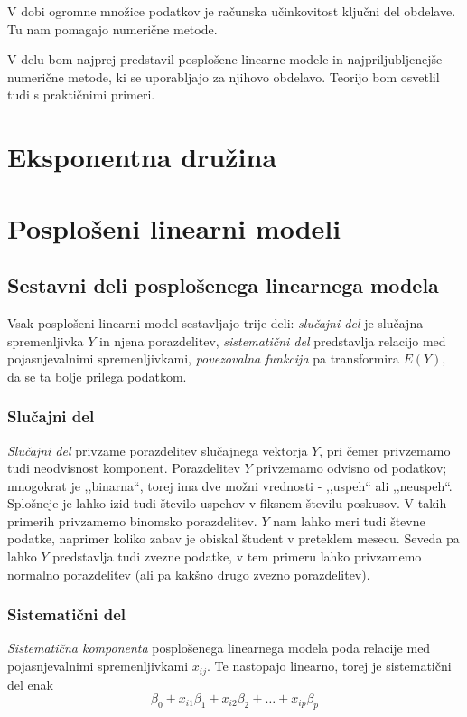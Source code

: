 \documentclass[12pt,a4paper]{amsart}
\theoremstyle{definition} %
\theoremstyle{plain} %
\begin{document}
V dobi ogromne množice podatkov je računska učinkovitost ključni del obdelave. Tu nam pomagajo numerične metode.

V delu bom najprej predstavil posplošene linearne modele in najpriljubljenejše numerične metode, ki se uporabljajo za njihovo obdelavo. 
Teorijo bom osvetlil tudi s praktičnimi primeri.

\section{Eksponentna družina} %

\section{Posplošeni linearni modeli}

\subsection{Sestavni deli posplošenega linearnega modela}
Vsak posplošeni linearni model sestavljajo trije deli: \textit{slučajni del} je slučajna spremenljivka $Y$ in njena porazdelitev, 
\textit{sistematični del} predstavlja relacijo med pojasnjevalnimi spremenljivkami, \textit{povezovalna funkcija} pa transformira $E(Y)$, da se ta
bolje prilega podatkom.

\subsubsection{Slučajni del}
\textit{Slučajni del} privzame porazdelitev slučajnega vektorja $Y$, pri čemer privzemamo tudi neodvisnost komponent. Porazdelitev $Y$
privzemamo odvisno od podatkov; mnogokrat je ,,binarna``, torej ima dve možni vrednosti - ,,uspeh`` ali ,,neuspeh``. Splošneje je lahko izid tudi 
število uspehov v fiksnem številu poskusov. V takih primerih privzamemo binomsko porazdelitev. $Y$ nam lahko meri tudi števne podatke, naprimer 
koliko zabav je obiskal študent v preteklem mesecu. Seveda pa lahko $Y$ predstavlja tudi zvezne podatke,
v tem primeru lahko privzamemo normalno porazdelitev (ali pa kakšno drugo zvezno porazdelitev).
\subsubsection{Sistematični del} 
\textit{Sistematična komponenta} posplošenega linearnega modela poda relacije med pojasnjevalnimi spremenljivkami $x_{ij}$. Te nastopajo 
linearno, torej je sistematični del enak
\[
\beta_{0} + x_{i1}\beta_{1} + x_{i2}\beta_{2} + \ldots + x_{ip}\beta_{p}
\]
\end{document}
